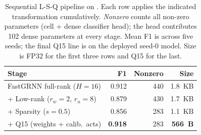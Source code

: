 \begin{table}[t]
\centering
\caption{Sequential L-S-Q pipeline on \hapt{}. Each row applies the
indicated transformation cumulatively. \emph{Nonzero} counts all
non-zero parameters (cell + dense classifier head); the head
contributes 102 dense parameters at every stage.
Mean F1 is across five seeds; the final Q15 line is on the
deployed seed-0 model. Size is FP32 for the first three rows
and Q15 for the last.}
\label{tab:lsq}
\setlength{\tabcolsep}{4pt}
\begin{tabular}{@{}lrrr@{}}
\toprule
Stage & F1 & Nonzero & Size \\
\midrule
FastGRNN full-rank ($H{=}16$)     & 0.912          & 440 & 1.8~KB \\
+ Low-rank ($r_w{=}2$, $r_u{=}8$) & 0.879          & 430 & 1.7~KB \\
+ Sparsity ($s{=}0.5$)            & 0.856          & 283 & 1.1~KB \\
+ Q15 (weights + calib.\ acts)    & \textbf{0.918} & 283 & \textbf{566~B} \\
\bottomrule
\end{tabular}
\end{table}

\begin{table}[t]
\centering
\caption{Per-seed L-S-Q pipeline on \hapt{} (3{,}399 test windows).
\emph{Q15/LUT F1}: PyTorch simulation, Q15 weights + calibrated
activation quantization (\S\ref{sec:method:q15}).
\emph{Agree}: PyTorch-FP32 vs NumPy-Q15 argmax matches
(C-equivalent harness, not bare-metal MCU; seed-0 MCU agreement
100\% via the \msp{} C engine, Table~\ref{tab:hstate}).
Seed~1 is a consistent convergence outlier across all stages
(see also Fig.~\ref{fig:lowrank}); mean$\pm$std includes it.
All seeds share the same nonzero count and weight budget because
the IHT mask enforces exactly $s{=}0.5$ sparsity.}
\label{tab:multiseed}
\end{table}


